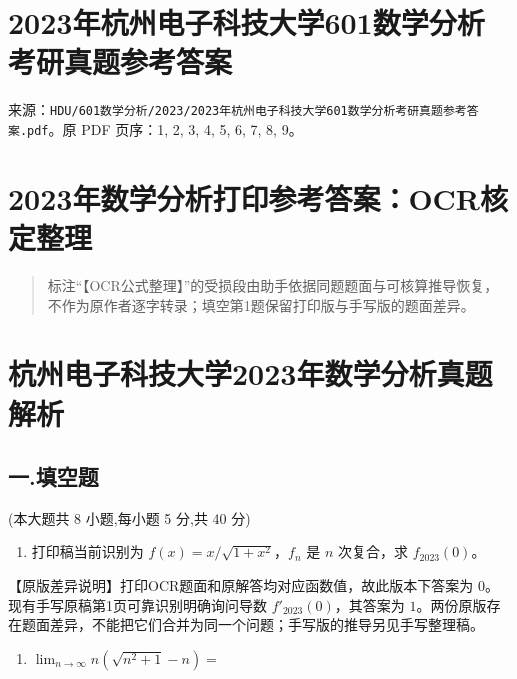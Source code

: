 \documentclass[11pt,fontset=fandol]{ctexart}
\providecommand{\tightlist}{\setlength{\itemsep}{0pt}\setlength{\parskip}{0pt}}
\begin{document}
\section{2023年杭州电子科技大学601数学分析考研真题参考答案}\label{ux5e74ux676dux5ddeux7535ux5b50ux79d1ux6280ux5927ux5b66601ux6570ux5b66ux5206ux6790ux8003ux7814ux771fux9898ux53c2ux8003ux7b54ux6848}

来源：\texttt{HDU/601数学分析/2023/2023年杭州电子科技大学601数学分析考研真题参考答案.pdf}。原
PDF 页序：1, 2, 3, 4, 5, 6, 7, 8, 9。

\section{2023年数学分析打印参考答案：OCR核定整理}\label{ux5e74ux6570ux5b66ux5206ux6790ux6253ux5370ux53c2ux8003ux7b54ux6848ocrux6838ux5b9aux6574ux7406}

\begin{quote}
标注``【OCR公式整理】''的受损段由助手依据同题题面与可核算推导恢复，不作为原作者逐字转录；填空第1题保留打印版与手写版的题面差异。
\end{quote}

\section{杭州电子科技大学2023年数学分析真题解析}\label{ux676dux5ddeux7535ux5b50ux79d1ux6280ux5927ux5b662023ux5e74ux6570ux5b66ux5206ux6790ux771fux9898ux89e3ux6790}

\subsection{一.填空题}\label{ux4e00.ux586bux7a7aux9898}

(本大题共 8 小题,每小题 5 分,共 40 分)

\begin{enumerate}
\def\labelenumi{\arabic{enumi}.}
\tightlist
\item
  打印稿当前识别为 \(f(x)=x/\sqrt{1+x^2}\)，\(f_n\) 是 \(n\) 次复合，求
  \(f_{2023}(0)\)。
\end{enumerate}

【原版差异说明】打印OCR题面和原解答均对应函数值，故此版本下答案为
\(0\)。现有手写原稿第1页可靠识别明确询问导数 \(f'_{2023}(0)\)，其答案为
\(1\)。两份原版存在题面差异，不能把它们合并为同一个问题；手写版的推导另见手写整理稿。

\begin{enumerate}
\def\labelenumi{\arabic{enumi}.}
\setcounter{enumi}{1}
\tightlist
\item
  \(\lim _ { n \to \infty } n ( { \sqrt { n ^ { 2 } + 1 } } - n ) =\)
\end{enumerate}
\end{document}

